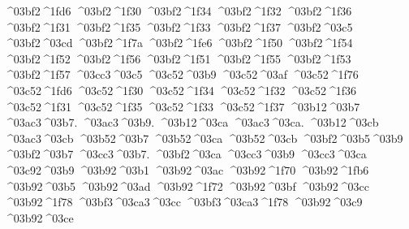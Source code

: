 {^^^^03bf2^^^^1fd6
^^^^03bf2^^^^1f30
^^^^03bf2^^^^1f34
^^^^03bf2^^^^1f32
^^^^03bf2^^^^1f36
^^^^03bf2^^^^1f31
^^^^03bf2^^^^1f35
^^^^03bf2^^^^1f33
^^^^03bf2^^^^1f37
^^^^03bf2^^^^03c5
^^^^03bf2^^^^03cd
^^^^03bf2^^^^1f7a
^^^^03bf2^^^^1fe6
^^^^03bf2^^^^1f50
^^^^03bf2^^^^1f54
^^^^03bf2^^^^1f52
^^^^03bf2^^^^1f56
^^^^03bf2^^^^1f51
^^^^03bf2^^^^1f55
^^^^03bf2^^^^1f53
^^^^03bf2^^^^1f57
^^^^03cc3^^^^03c5
^^^^03c52^^^^03b9
^^^^03c52^^^^03af
^^^^03c52^^^^1f76
^^^^03c52^^^^1fd6
^^^^03c52^^^^1f30
^^^^03c52^^^^1f34
^^^^03c52^^^^1f32
^^^^03c52^^^^1f36
^^^^03c52^^^^1f31
^^^^03c52^^^^1f35
^^^^03c52^^^^1f33
^^^^03c52^^^^1f37
^^^^03b12^^^^03b7
^^^^03ac3^^^^03b7. %
^^^^03ac3^^^^03b9.  %
^^^^03b12^^^^03ca
^^^^03ac3^^^^03ca. %
^^^^03b12^^^^03cb   %
^^^^03ac3^^^^03cb
^^^^03b52^^^^03b7    %
^^^^03b52^^^^03ca   %
^^^^03b52^^^^03cb   %
^^^^03bf2^^^^03b5^^^^03b9   %
^^^^03bf2^^^^03b7    %
^^^^03cc3^^^^03b7.  %
^^^^03bf2^^^^03ca
^^^^03cc3^^^^03b9   %
^^^^03cc3^^^^03ca
^^^^03c92^^^^03b9    %
^^^^03b92^^^^03b1
^^^^03b92^^^^03ac
^^^^03b92^^^^1f70
^^^^03b92^^^^1fb6
^^^^03b92^^^^03b5
^^^^03b92^^^^03ad
^^^^03b92^^^^1f72
^^^^03b92^^^^03bf
^^^^03b92^^^^03cc
^^^^03b92^^^^1f78
^^^^03bf3^^^^03ca3^^^^03cc %
^^^^03bf3^^^^03ca3^^^^1f78
^^^^03b92^^^^03c9
^^^^03b92^^^^03ce
}
